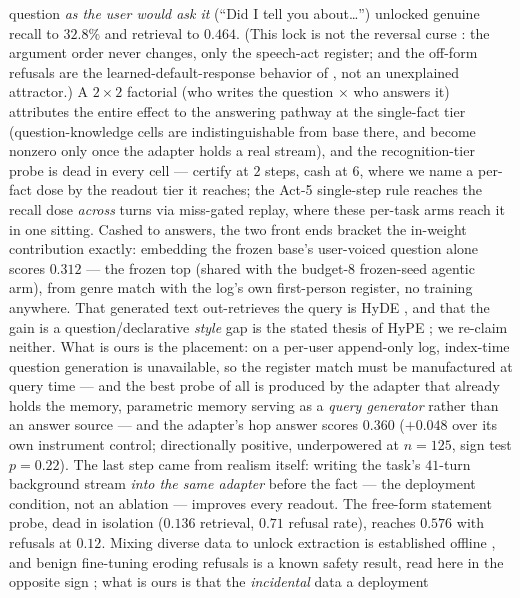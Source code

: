 \documentclass[11pt]{article}
\begin{document}
question \emph{as the user would ask it} (``Did I tell you about\ldots'') unlocked genuine
recall to $32.8\%$ and retrieval to $0.464$. (This lock is not the reversal curse
\citep{berglund2024reversal}: the argument order never changes, only the speech-act
register; and the off-form refusals are the learned-default-response behavior of
\citet{kang2024unfamiliar}, not an unexplained attractor.) A $2{\times}2$ factorial (who
writes the question $\times$ who answers it) attributes the entire effect to the answering pathway at
the single-fact tier (question-knowledge cells are indistinguishable from base there, and
become nonzero only once the adapter holds a real stream), and the recognition-tier probe
is dead in every cell --- certify at $2$ steps, cash at $6$, where we name a per-fact dose
by the readout tier it reaches; the Act-5 single-step rule reaches the recall dose
\emph{across} turns via miss-gated replay, where these per-task arms reach it in one
sitting. Cashed to answers, the two
front ends bracket the in-weight contribution exactly: embedding the frozen base's
user-voiced question alone scores $0.312$ --- the frozen top (shared with the budget-8
frozen-seed agentic arm), from genre match with the
log's own first-person register, no training anywhere. That generated text out-retrieves
the query is HyDE \citep{gao2023hyde}, and that the gain is a question/declarative
\emph{style} gap is the stated thesis of HyPE \citep{vake2026hype}; we re-claim neither.
What is ours is the placement: on a per-user append-only log, index-time question
generation is unavailable, so the register match must be manufactured at query time --- and
the best probe of all is produced by the adapter that already holds the memory, parametric
memory serving as a \emph{query generator} rather than an answer source --- and the adapter's hop answer
scores $0.360$ ($+0.048$ over its own instrument control; directionally positive,
underpowered at $n{=}125$, sign test $p{=}0.22$). The last step came from realism
itself: writing the task's $41$-turn background stream \emph{into the same adapter} before
the fact --- the deployment condition, not an ablation --- improves every readout. The
free-form statement probe, dead in isolation ($0.136$ retrieval, $0.71$ refusal rate),
reaches $0.576$ with refusals at $0.12$. Mixing diverse data to unlock extraction is
established offline \citep{allenzhu2024,chen2024remix,sun2025mixed}, and benign
fine-tuning eroding refusals is a known safety result, read here in the opposite sign
\citep{qi2023finetune}; what is ours is that the \emph{incidental} data a deployment
\end{document}
